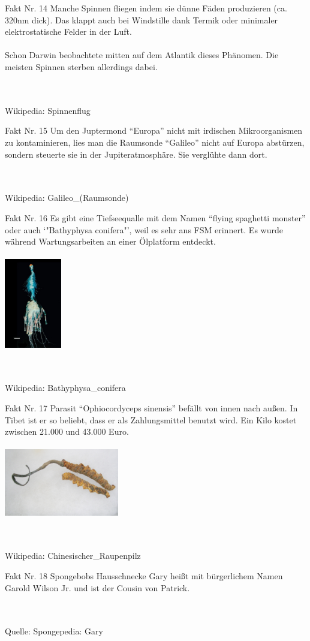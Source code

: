 \documentclass{beamer}
\newenvironment{fakt}[1]
{\begin{frame}{Fakt Nr. #1}\centering}
{\end{frame}}
\newcommand{\rating}[1]{}
\newcommand{\wiki}[1]{\\\hfill\\Wikipedia: #1}
\newcommand{\source}[1]{\\\hfill\\Quelle: #1}
\begin{document}
	\begin{fakt}{14}
		Manche Spinnen fliegen indem sie dünne Fäden produzieren (ca. 320nm dick). Das klappt auch bei Windstille dank Termik oder minimaler elektrostatische Felder in der Luft.\\
		\hfill\\
		Schon Darwin beobachtete mitten auf dem Atlantik dieses Phänomen. Die meisten Spinnen sterben allerdings dabei.
		\rating{9}
		\wiki{Spinnenflug}
	\end{fakt}
	
	\begin{fakt}{15}
		Um den Juptermond "`Europa"' nicht mit irdischen Mikroorganismen zu kontaminieren, lies man die Raumsonde "`Galileo"' nicht auf Europa abstürzen, sondern steuerte sie in der Jupiteratmosphäre. Sie verglühte dann dort.
		\rating{10}
		\wiki{Galileo\_(Raumsonde)}
	\end{fakt}
	
	\begin{fakt}{16}
		Es gibt eine Tiefseequalle mit dem Namen "`flying spaghetti monster"' oder auch `"Bathyphysa conifera"', weil es sehr ans FSM erinnert. Es wurde während Wartungsarbeiten an einer Ölplatform entdeckt.\\
		\hfill\\
		\includegraphics[width=2.5cm]{images/fsm}
		\rating{8}
		\wiki{Bathyphysa\_conifera}
	\end{fakt}
	
	\begin{fakt}{17}
		Parasit "`Ophiocordyceps sinensis"' befällt von innen nach außen.
		In Tibet ist er so beliebt, dass er als Zahlungsmittel benutzt wird.
		Ein Kilo kostet zwischen 21.000 und 43.000 Euro.\\
		\hfill\\
		\includegraphics[width=5cm]{images/CordycepsSinensis}
		\rating{8}
		\wiki{Chinesischer\_Raupenpilz}
	\end{fakt}
	
	\begin{fakt}{18}
		Spongebobs Hausschnecke Gary heißt mit bürgerlichem Namen Garold Wilson Jr. und ist der Cousin von Patrick.
		\rating{11}
		\source{Spongepedia: Gary}
	\end{fakt}
\end{document}
